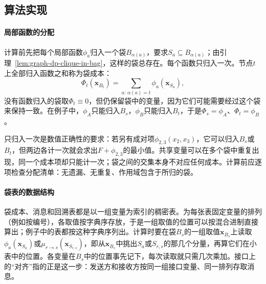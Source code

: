 \subsection{算法实现}
\label{sec:graph-dp-bag-algorithm}

\paragraph{局部函数的分配}
计算前先把每个局部函数$\phi_a$归入一个袋$B_{\alpha(a)}$，要求$S_a\subseteq B_{\alpha(a)}$；由引理~\ref{lem:graph-dp-clique-in-bag}，这样的袋总存在。每个函数只归入一次。节点$t$上全部归入函数之和称为袋成本：
\begin{equation}
\Phi_t(\bm x_{B_t})=\sum_{a:\,\alpha(a)=t}\phi_a(\bm x_{S_a}),
\label{eq:graph-dp-bag-cost}
\end{equation}
没有函数归入的袋取$\Phi_t\equiv0$，但仍保留袋中的变量，因为它们可能需要经过这个袋来保持一致。在例子中，$\phi_A$只能归入$B_s$，$\phi_B$只能归入$B_t$，于是$\Phi_s=\phi_A$、$\Phi_t=\phi_B$。

只归入一次是数值正确性的要求：若另有成对项$\phi_{2,3}(x_2,x_3)$，它可以归入$B_s$或$B_t$，但两边各计一次就会求出$F+\phi_{2,3}$的最小值。共享变量可以在多个袋中重复出现，同一个成本项却只能计一次；袋之间的交集本身不对应任何成本。计算前应逐项检查分配清单：无遗漏、无重复、作用域包含于所归的袋。

\paragraph{袋表的数据结构}
袋成本、消息和回溯表都是以一组变量为索引的稠密表。为每张表固定变量的排列（例如按编号），各取值按字典序存放，于是一组取值的位置可以按混合进制直接算出；例子中的表都按这种字典序列出。计算时要在袋$B_s$的一组取值$\bm x_{B_s}$上读取$\phi_a(\bm x_{S_a})$或$\mu_{r\to s}(\bm x_{S_{r,s}})$，即从$\bm x_{B_s}$中挑出$S_a$或$S_{r,s}$的那几个分量，再算它们在小表中的位置。各变量在$B_s$中的位置事先记下，每次读取就只需几次乘加。接口上的“对齐”指的正是这一步：发送方和接收方按同一组接口变量、同一排列存取消息。

